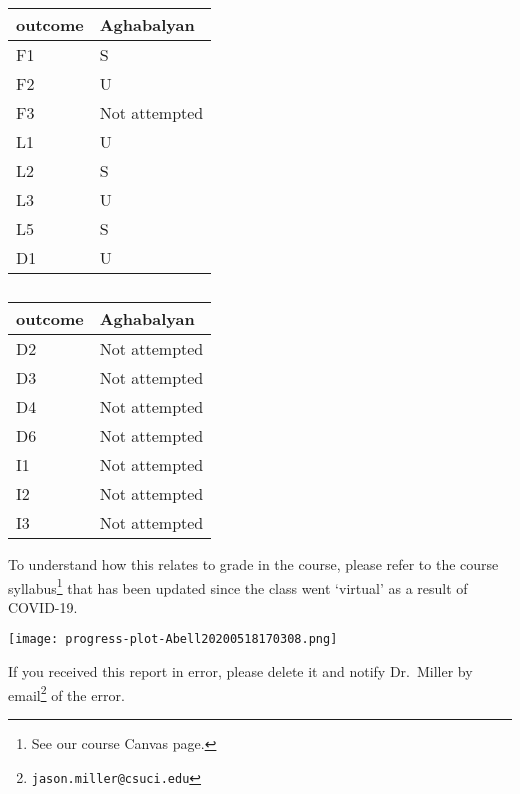 \documentclass[]{tufte-handout}
\begin{document}
\begin{table}[!htb]
\begin{minipage}{.5\linewidth}
      \caption{}
      \centering
        {
\begin{tabular}{ll}
\toprule
outcome & Aghabalyan\\
\midrule
F1 & S\\
F2 & U\\
F3 & Not attempted\\
L1 & U\\
L2 & S\\
\addlinespace
L3 & U\\
L5 & S\\
D1 & U\\
\bottomrule
\end{tabular}

}
    \end{minipage}%
    \begin{minipage}{.5\linewidth}
      \centering
        \caption{}
        {
\begin{tabular}{ll}
\toprule
outcome & Aghabalyan\\
\midrule
D2 & Not attempted\\
D3 & Not attempted\\
D4 & Not attempted\\
D6 & Not attempted\\
I1 & Not attempted\\
\addlinespace
I2 & Not attempted\\
I3 & Not attempted\\
\bottomrule
\end{tabular}

}
        \end{minipage} 
\end{table}

\noindent To understand how this relates to grade in the course, please
refer to the course syllabus\footnote{See our course Canvas page.} that
has been updated since the class went `virtual' as a result of COVID-19.

\begin{sidewaysfigure}[h]
\centering
\texttt{[image: progress-plot-Abell20200518170308.png]}
\end{sidewaysfigure}

\medskip

\noindent If you received this report in error, please delete it and
notify Dr.~Miller by email\footnote{\texttt{jason.miller@csuci.edu}} of
the error.
\end{document}
